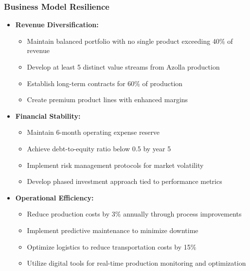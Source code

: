 \subsubsection{Business Model Resilience}
\begin{itemize}
    \item \textbf{Revenue Diversification:}
    \begin{itemize}
        \item Maintain balanced portfolio with no single product exceeding 40\% of revenue
        \item Develop at least 5 distinct value streams from Azolla production
        \item Establish long-term contracts for 60\% of production
        \item Create premium product lines with enhanced margins
    \end{itemize}
    
    \item \textbf{Financial Stability:}
    \begin{itemize}
        \item Maintain 6-month operating expense reserve
        \item Achieve debt-to-equity ratio below 0.5 by year 5
        \item Implement risk management protocols for market volatility
        \item Develop phased investment approach tied to performance metrics
    \end{itemize}
    
    \item \textbf{Operational Efficiency:}
    \begin{itemize}
        \item Reduce production costs by 3\% annually through process improvements
        \item Implement predictive maintenance to minimize downtime
        \item Optimize logistics to reduce transportation costs by 15\%
        \item Utilize digital tools for real-time production monitoring and optimization
    \end{itemize}
\end{itemize}


